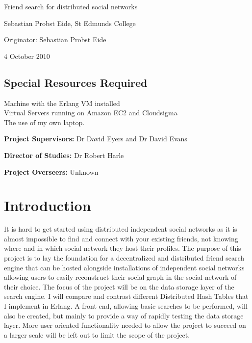 

\vfil

\centerline{\Large Friend search for distributed social networks }
\vspace{0.4in}
\centerline{\large Sebastian Probst Eide, St Edmunds College }
\vspace{0.3in}
\centerline{\large Originator: Sebastian Probst Eide}
\vspace{0.3in}
\centerline{\large 4 October 2010}

\vfil

\subsection*{Special Resources Required}
Machine with the Erlang VM installed \\
Virtual Servers running on Amazon EC2 and Cloudsigma \\
The use of my own laptop.
\vspace{0.2in}

\noindent
{\bf Project Supervisors:} Dr David Eyers and Dr David Evans
\vspace{0.2in}

\noindent
{\bf Director of Studies:} Dr Robert Harle
\vspace{0.2in}
\noindent
 
\noindent
{\bf Project Overseers:} Unknown 

\vfil
\pagebreak


\section*{Introduction}

It is hard to get started using distributed independent social networks as it is almost impossible to find and connect with your existing friends, not knowing where and in which social network they host their profiles. The purpose of this project is to lay the foundation for a decentralized and distributed friend search engine that can be hosted alongside installations of independent social networks allowing users to easily reconstruct their social graph in the social network of their choice. The focus of the project will be on the data storage layer of the search engine. I will compare and contrast different Distributed Hash Tables that I implement in Erlang. A front end, allowing basic searches to be performed, will also be created, but mainly to provide a way of rapidly testing the data storage layer. More user oriented functionality needed to allow the project to succeed on a larger scale will be left out to limit the scope of the project.

